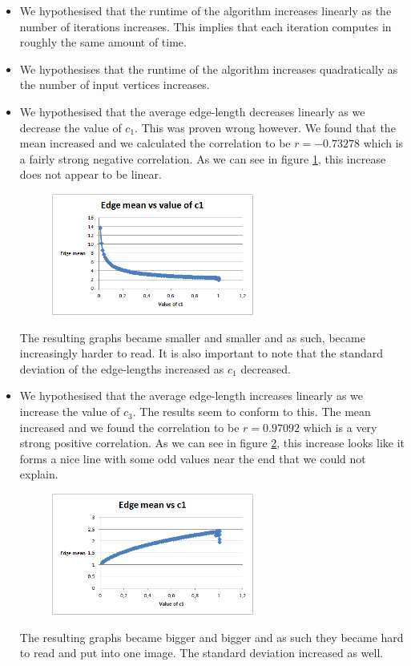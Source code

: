 \documentclass[a4paper,12pt]{article}
\begin{document}
\begin{itemize}
\item We hypothesised that the runtime of the algorithm increases linearly as the number of iterations increases. This implies that each iteration computes in roughly the same amount of time.
\item We hypothesises that the runtime of the algorithm increases quadratically as the number of input vertices increases.
\item We hypothesised that the average edge-length decreases linearly as we decrease the value of $c_1$. This was proven wrong however. We found that the mean increased and we calculated the correlation to be $r=-0.73278$ which is a fairly strong negative correlation. As we can see in figure \ref{fig:graphc1}, this increase does not appear to be linear.
\begin{figure}[h]
	\centering
	\includegraphics[height=4cm]{Edgemeanvsc1}
	\label{fig:graphc1}
\end{figure}
The resulting graphs became smaller and smaller and as such, became increasingly harder to read. It is also important to note that the standard deviation of the edge-lengths increased as $c_1$ decreased.
\item We hypothesised that the average edge-length increases linearly as we increase the value of $c_3$. The results seem to conform to this. The mean increased and we found the correlation to be $r=0.97092$ which is a very strong positive correlation. As we can see in figure \ref{fig:graphc3}, this increase looks like it forms a nice line with some odd values near the end that we could not explain.
\begin{figure}[h]
	\centering
	\includegraphics[height=4cm]{Edgemeanvsc3}
	\label{fig:graphc3}
\end{figure}
The resulting graphs became bigger and bigger and as such they became hard to read and put into one image. The standard deviation increased as well.
\end{itemize}
\end{document}
